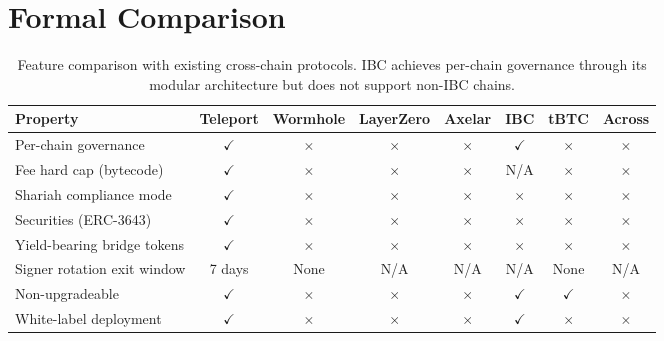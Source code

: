 \section{Formal Comparison}

\label{sec:comparison}

\begin{table}[t]
\centering
\small
\begin{tabular}{@{}lccccccc@{}}
\toprule
\textbf{Property} & \textbf{Teleport} & \textbf{Wormhole} & \textbf{LayerZero} & \textbf{Axelar} & \textbf{IBC} & \textbf{tBTC} & \textbf{Across} \\
\midrule
Per-chain governance & $\checkmark$ & $\times$ & $\times$ & $\times$ & $\checkmark$ & $\times$ & $\times$ \\
Fee hard cap (bytecode) & $\checkmark$ & $\times$ & $\times$ & $\times$ & N/A & $\times$ & $\times$ \\
Shariah compliance mode & $\checkmark$ & $\times$ & $\times$ & $\times$ & $\times$ & $\times$ & $\times$ \\
Securities (ERC-3643) & $\checkmark$ & $\times$ & $\times$ & $\times$ & $\times$ & $\times$ & $\times$ \\
Yield-bearing bridge tokens & $\checkmark$ & $\times$ & $\times$ & $\times$ & $\times$ & $\times$ & $\times$ \\
Signer rotation exit window & 7 days & None & N/A & N/A & N/A & None & N/A \\
Non-upgradeable & $\checkmark$ & $\times$ & $\times$ & $\times$ & $\checkmark$ & $\checkmark$ & $\times$ \\
White-label deployment & $\checkmark$ & $\times$ & $\times$ & $\times$ & $\checkmark$ & $\times$ & $\times$ \\
\bottomrule
\end{tabular}
\caption{Feature comparison with existing cross-chain protocols. IBC achieves per-chain governance through its modular architecture but does not support non-IBC chains.}
\label{tab:comparison}
\end{table}


